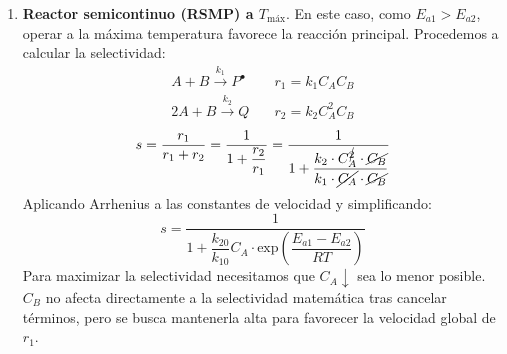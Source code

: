 \begin{enumerate}[label=\Roman*.]
	\item \textbf{Reactor semicontinuo (RSMP) a $T_{\text{máx}}$}. En este caso, como $E_{a1} > E_{a2}$, operar a la máxima temperatura favorece la reacción principal. Procedemos a calcular la selectividad:
	      \begin{align*}
		      A +B \xrightarrow{k_1} P^{\bullet} \quad & r_1 = k_1 C_A C_B   \\
		      2A + B \xrightarrow{k_2} Q \quad         & r_2 = k_2 C_A^2 C_B
	      \end{align*}
	      \begin{equation*}
		      s = \frac{r_1}{r_1+r_2} = \frac{1}{1+\dfrac{r_2}{r_1}}= \frac{1}{1+\dfrac{k_2\cdot C_A^{\cancel{2}}\cdot \cancel{C_B}}{k_1\cdot \cancel{C_A}\cdot \cancel{C_B}}}
	      \end{equation*}
	      Aplicando Arrhenius a las constantes de velocidad y simplificando:
	      \begin{equation}
		      s = \frac{1}{1+\dfrac{k_{20}}{k_{10}} C_A\cdot \text{exp}\left(\dfrac{E_{a1}-E_{a2}}{RT}\right)}
	      \end{equation}
	      Para maximizar la selectividad necesitamos que $C_A \downarrow$ sea lo menor posible. $C_B$ no afecta directamente a la selectividad matemática tras cancelar términos, pero se busca mantenerla alta para favorecer la velocidad global de $r_1$.\\

	      \begin{center}
	      \end{center}


\end{enumerate}
